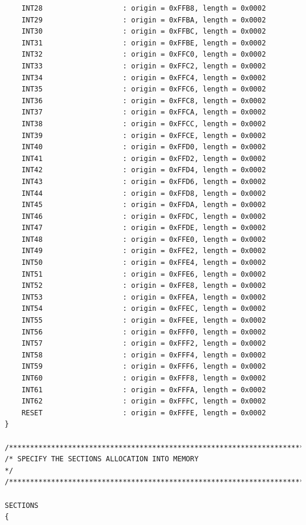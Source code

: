 \documentclass[LaM,binding=0.6cm,oneside]{../sapthesis}
\begin{document}
\begin{lstlisting}
    INT28                   : origin = 0xFFB8, length = 0x0002
    INT29                   : origin = 0xFFBA, length = 0x0002
    INT30                   : origin = 0xFFBC, length = 0x0002
    INT31                   : origin = 0xFFBE, length = 0x0002
    INT32                   : origin = 0xFFC0, length = 0x0002
    INT33                   : origin = 0xFFC2, length = 0x0002
    INT34                   : origin = 0xFFC4, length = 0x0002
    INT35                   : origin = 0xFFC6, length = 0x0002
    INT36                   : origin = 0xFFC8, length = 0x0002
    INT37                   : origin = 0xFFCA, length = 0x0002
    INT38                   : origin = 0xFFCC, length = 0x0002
    INT39                   : origin = 0xFFCE, length = 0x0002
    INT40                   : origin = 0xFFD0, length = 0x0002
    INT41                   : origin = 0xFFD2, length = 0x0002
    INT42                   : origin = 0xFFD4, length = 0x0002
    INT43                   : origin = 0xFFD6, length = 0x0002
    INT44                   : origin = 0xFFD8, length = 0x0002
    INT45                   : origin = 0xFFDA, length = 0x0002
    INT46                   : origin = 0xFFDC, length = 0x0002
    INT47                   : origin = 0xFFDE, length = 0x0002
    INT48                   : origin = 0xFFE0, length = 0x0002
    INT49                   : origin = 0xFFE2, length = 0x0002
    INT50                   : origin = 0xFFE4, length = 0x0002
    INT51                   : origin = 0xFFE6, length = 0x0002
    INT52                   : origin = 0xFFE8, length = 0x0002
    INT53                   : origin = 0xFFEA, length = 0x0002
    INT54                   : origin = 0xFFEC, length = 0x0002
    INT55                   : origin = 0xFFEE, length = 0x0002
    INT56                   : origin = 0xFFF0, length = 0x0002
    INT57                   : origin = 0xFFF2, length = 0x0002
    INT58                   : origin = 0xFFF4, length = 0x0002
    INT59                   : origin = 0xFFF6, length = 0x0002
    INT60                   : origin = 0xFFF8, length = 0x0002
    INT61                   : origin = 0xFFFA, length = 0x0002
    INT62                   : origin = 0xFFFC, length = 0x0002
    RESET                   : origin = 0xFFFE, length = 0x0002
}

/****************************************************************************/
/* SPECIFY THE SECTIONS ALLOCATION INTO MEMORY                              */
/****************************************************************************/

SECTIONS
{


\end{lstlisting}
\end{document}
